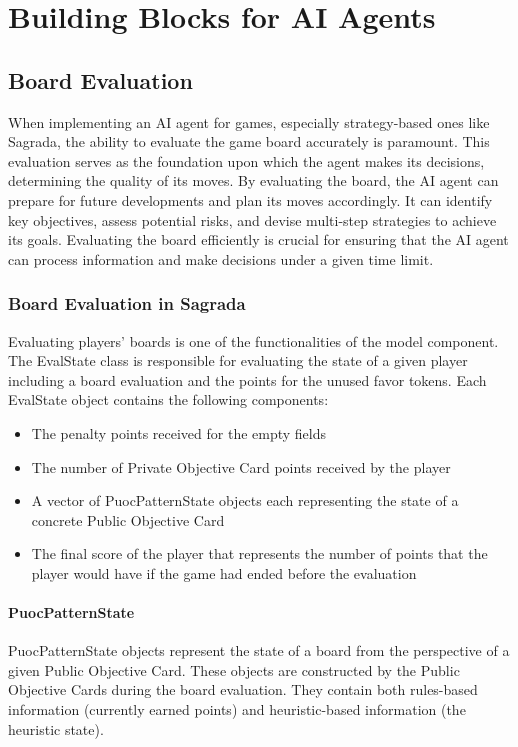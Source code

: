 \chapter{Building Blocks for AI Agents}

\section{Board Evaluation}

When implementing an AI agent for games, especially strategy-based ones like Sagrada, the ability to evaluate the 
game board accurately is paramount. This evaluation serves as the foundation upon which the agent makes its decisions, 
determining the quality of its moves. By evaluating the board, the AI agent can 
prepare for future developments and plan its moves accordingly. It can identify key objectives, assess potential risks, 
and devise multi-step strategies to achieve its goals.  Evaluating the board efficiently is crucial for ensuring that 
the AI agent can process information and make decisions under a given time limit. 

\subsection{Board Evaluation in Sagrada} \label{subsec:Board_Evaluation_In_Sagrada}

Evaluating players' boards is one of the functionalities of the model component. The EvalState class is responsible for evaluating
the state of a given player including a board evaluation and the points for the unused favor tokens. Each EvalState object contains
the following components:
\begin{itemize}
    \item The penalty points received for the empty fields
    \item The number of Private Objective Card points received by the player
    \item A vector of PuocPatternState objects each representing the state of a concrete Public Objective Card
    \item The final score of the player that represents the number of points that the player would have if the game had ended before the evaluation
\end{itemize}


\subsubsection{PuocPatternState}
PuocPatternState objects represent the state of a board from the perspective of a given Public Objective Card. These objects
are constructed by the Public Objective Cards during the board evaluation. They contain both rules-based information 
(currently earned points) and heuristic-based information (the heuristic state).

